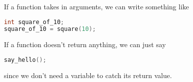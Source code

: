 If a function takes in arguments, we can write something like
\lstset{basicstyle=\scriptsize, numbers=left, captionpos=b, tabsize=4}
\begin{lstlisting}[caption=Section \thesection listing \arabic{funccnt},language={C},
breaklines=true,xleftmargin=15pt, label=lst:section\thesection listing\arabic{funccnt}]
int square_of_10;
square_of_10 = square(10);
\end{lstlisting}

If a function doesn't return anything, we can just say
\lstset{basicstyle=\scriptsize, numbers=left, captionpos=b, tabsize=4}
\begin{lstlisting}[caption=Section \thesection listing \arabic{funccnt},language={C},
breaklines=true,xleftmargin=15pt, label=lst:section\thesection listing\arabic{funccnt}]
say_hello();
\end{lstlisting}

since we don't need a variable to catch its return value.

